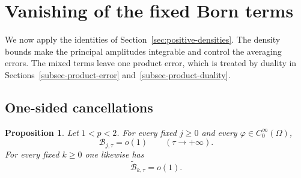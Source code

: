 \documentclass[a4paper,11pt]{article}
\theoremstyle{plain}
\newtheorem{prop}[thm]{Proposition}
\theoremstyle{definition}
\theoremstyle{remark}
\begin{document}
\section{Vanishing of the fixed Born terms}\label{sec:fixed-cancellations}

We now apply the identities of Section~\ref{sec:positive-densities}. The density bounds make the principal amplitudes integrable and control the averaging errors. The mixed terms leave one product error, which is treated by duality in Sections~\ref{subsec-product-error} and~\ref{subsec-product-duality}.

\subsection{One-sided cancellations}

\begin{prop}\label{prop-fixed-one-sided-cancellations}
Let $1<p<2$.  For every fixed $j\geq0$ and every
$\varphi\in C_0^\infty(\Omega)$,
\begin{equation}\label{fixed-linear-cancellation}
        \mathcal B_{j,\tau}=o(1)
        \qquad (\tau\to+\infty).
\end{equation}
For every fixed $k\geq0$ one likewise has
\begin{equation}\label{fixed-right-linear-cancellation}
        \widetilde{\mathcal B}_{k,\tau}=o(1).
\end{equation}
\end{prop}
\end{document}
